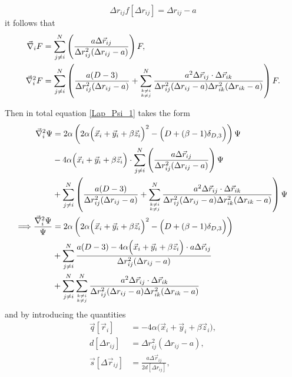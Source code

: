 \documentclass[a4paper,8pt]{article}
\begin{document}
\begin{equation}
\Delta{r}_{ij} f[\Delta{r}_{ij}] = \Delta{r}_{ij}-a \nonumber
\end{equation}
it follows that
\begin{align}
\vec{\nabla}_i F &= \sum\limits_{j \neq i}^N \left(\frac{a\Delta\vec{r}_{ij}}{\Delta{r}_{ij}^2(\Delta{r}_{ij}-a)}\right) F, \label{grad_F}\\
\vec{\nabla}_i^2 F &= \sum\limits_{j \neq i}^N \left(\frac{a(D-3)}{\Delta{r}_{ij}^2(\Delta{r}_{ij}-a)} + \sum\limits_{{k \neq i}\atop{k \neq j}}^N \frac{a^2 \Delta\vec{r}_{ij} \cdot \Delta\vec{r}_{ik}}{\Delta{r}_{ij}^2(\Delta{r}_{ij}-a) \Delta{r}_{ik}^2(\Delta{r}_{ik}-a)}\right) F. \label{Lap_F}
\end{align}

Then in total equation \eqref{Lap_Psi_1} takes the form
\begin{align}
\vec{\nabla}_i^2\Psi &= 2\alpha\left(2\alpha\Big(\vec{x}_i+\vec{y}_i+\beta\vec{z}_i\Big)^2-\Big(D+(\beta-1)\delta_{D,3}\Big)\right) \Psi \nonumber\\
&- 4\alpha\Big(\vec{x}_i+\vec{y}_i+\beta\vec{z}_i\Big) \cdot \sum\limits_{j \neq i}^N \left(\frac{a\Delta\vec{r}_{ij}}{\Delta{r}_{ij}^2(\Delta{r}_{ij}-a)}\right) \Psi \nonumber\\
&+ \sum\limits_{j \neq i}^N \left(\frac{a(D-3)}{\Delta{r}_{ij}^2(\Delta{r}_{ij}-a)} + \sum\limits_{{k \neq i}\atop{k \neq j}}^N \frac{a^2 \Delta\vec{r}_{ij} \cdot \Delta\vec{r}_{ik}}{\Delta{r}_{ij}^2(\Delta{r}_{ij}-a) \Delta{r}_{ik}^2(\Delta{r}_{ik}-a)}\right) \Psi \nonumber\\
\Longrightarrow \frac{\vec{\nabla}_i^2\Psi}{\Psi} &= 2\alpha\left(2\alpha\Big(\vec{x}_i+\vec{y}_i+\beta\vec{z}_i\Big)^2-\Big(D+(\beta-1)\delta_{D,3}\Big)\right) \nonumber\\
&+ \sum\limits_{j \neq i}^N \frac{a(D-3) - 4\alpha\Big(\vec{x}_i+\vec{y}_i+\beta\vec{z}_i\Big) \cdot a\Delta\vec{r}_{ij}}{\Delta{r}_{ij}^2(\Delta{r}_{ij}-a)} \nonumber\\
&+ \sum\limits_{j \neq i}^N \sum\limits_{{k \neq i}\atop{k \neq j}}^N \frac{a^2 \Delta\vec{r}_{ij} \cdot \Delta\vec{r}_{ik}}{\Delta{r}_{ij}^2(\Delta{r}_{ij}-a) \Delta{r}_{ik}^2(\Delta{r}_{ik}-a)}
\end{align}
and by introducing the quantities
\begin{align}
\vec{q}[\vec{r}_i] &= -4\alpha\Big(\vec{x}_i+\vec{y}_i+\beta\vec{z}_i\Big), \label{q}\\
d[\Delta{r}_{ij}] &= \Delta{r}_{ij}^2(\Delta{r}_{ij}-a), \label{d}\\
\vec{s}[\Delta\vec{r}_{ij}] &= \frac{a\Delta\vec{r}_{ij}}{2d[\Delta{r}_{ij}]}, \label{s}
\end{align}
\end{document}
